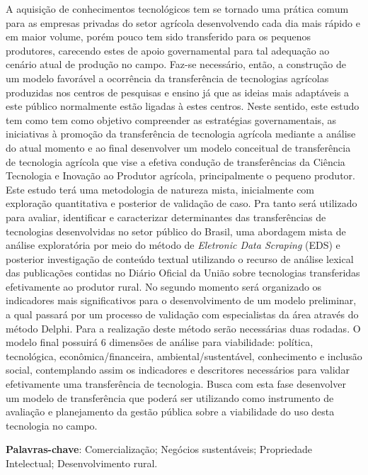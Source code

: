 \setlength{\absparsep}{18pt} %
\begin{resumo}




A aquisição de conhecimentos tecnológicos tem se tornado uma prática comum para as empresas privadas do setor agrícola desenvolvendo cada dia mais rápido e em maior volume, porém pouco tem sido transferido para os pequenos produtores, carecendo estes de apoio governamental para tal adequação ao cenário atual de produção no campo. Faz-se necessário, então, a construção de um modelo favorável a ocorrência da transferência de tecnologias agrícolas produzidas nos centros de pesquisas e ensino já que as ideias mais adaptáveis a este público normalmente estão ligadas à estes centros. Neste sentido, este estudo tem como tem como objetivo compreender as estratégias governamentais, as iniciativas à promoção da transferência de tecnologia agrícola mediante a análise do atual momento e ao final desenvolver um modelo conceitual de transferência de tecnologia agrícola que vise a efetiva condução de transferências da Ciência Tecnologia e Inovação ao Produtor agrícola, principalmente o pequeno produtor. Este estudo terá uma metodologia de natureza mista, inicialmente com exploração quantitativa e posterior de validação de caso. Pra tanto será utilizado para avaliar, identificar e caracterizar determinantes das transferências de tecnologias desenvolvidas no setor público do Brasil, uma abordagem mista de análise exploratória  por meio do método de \textit{Eletronic Data Scraping} (EDS) e posterior  investigação de conteúdo textual utilizando o recurso de análise lexical das publicações contidas no Diário Oficial da União sobre tecnologias transferidas efetivamente ao produtor rural. No segundo momento será organizado os indicadores mais significativos para o desenvolvimento de um modelo preliminar, a qual passará por um processo de validação com especialistas da área através do método Delphi. Para a realização deste método serão necessárias duas rodadas. O modelo final possuirá 6 dimensões de análise para viabilidade: política, tecnológica, econômica/financeira, ambiental/sustentável, conhecimento e inclusão social, contemplando assim os indicadores e descritores necessários para validar efetivamente uma transferência de tecnologia. Busca com esta fase desenvolver um modelo de transferência que poderá ser utilizando como instrumento de avaliação e planejamento da gestão pública sobre a viabilidade do uso desta tecnologia no campo.

\textbf{Palavras-chave}: Comercialização; Negócios sustentáveis; Propriedade Intelectual; Desenvolvimento rural.
\end{resumo}